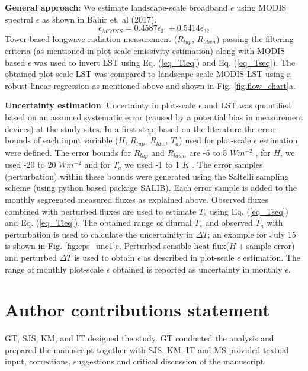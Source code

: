 \documentclass[fleqn,10pt]{wlscirep}
\begin{document}
\textbf{General approach}:
We estimate landscape-scale broadband $\epsilon$ using MODIS spectral $\epsilon$ as shown in Bahir et. al (2017)\cite{bahir2017evaluation}.
\begin{equation}\label{eq_emodis}
\epsilon_{MODIS}= 0.4587 \epsilon_{31} + 0.5414 \epsilon_{32}
\end{equation}
Tower-based longwave radiation measurement ($R_{lup}$, $R_{ldwn}$) passing the filtering criteria (as mentioned in plot-scale emissivity estimation) along with MODIS based $\epsilon$ was used to invert LST using Eq. (\ref{eq_Tleq}) and  Eq. (\ref{eq_Tseq}). The obtained plot-scale LST was compared to landscape-scale MODIS LST using a robust linear regression as mentioned above and shown in Fig. \ref{fig:flow_chart}a.

\textbf{Uncertainty estimation}:
Uncertainty in plot-scale $\epsilon$ and LST was quantified based on an assumed systematic error (caused by a potential bias in measurement devices) at the study sites. In a first step, based on the literature \cite{trenberth2012tracking,foken2008energy} the error bounds of each input variable ($ H$, $R_{lup}$, $R_{ldw}$, $T_{a}$) used for plot-scale $\epsilon$ estimation were defined. The error bounds for $R_{lup}$ and $R_{ldwn}$ are -5 to 5 $Wm^{-2}$ \cite{trenberth2012tracking}, for $H$, we used -20 to 20 $Wm^{-2}$ and for $T_{a}$ we used -1 to 1 $K$ \cite{foken2008energy}. The error samples (perturbation) within these bounds were generated using the Saltelli sampling scheme (using python based package SALIB\cite{saltelli2017new}). Each error sample is added to the monthly segregated measured fluxes as explained above. Observed fluxes combined with perturbed fluxes are used to estimate $T_{s}$ using Eq. (\ref{eq_Tseq}) and  Eq. (\ref{eq_Tleq}). The obtained range of diurnal $T_{s}$ and observed $T_{a}$ with perturbation is used to calculate the uncertainity in $\Delta T$; an example for July 15 is shown in Fig. \ref{fig:eps_unc1}c. Perturbed sensible heat flux($H + $sample error) and perturbed $\Delta T$ is used to obtain $\epsilon$ as described in plot-scale $\epsilon$ estimation. The range of monthly plot-scale $\epsilon$ obtained is reported as uncertainty in monthly $\epsilon$. 
\section{Author contributions statement}
GT, SJS, KM, and IT designed the study. GT conducted the analysis and prepared the manuscript together with SJS. KM, IT and MS provided textual input, corrections, suggestions and critical discussion of the manuscript.
\end{document}
